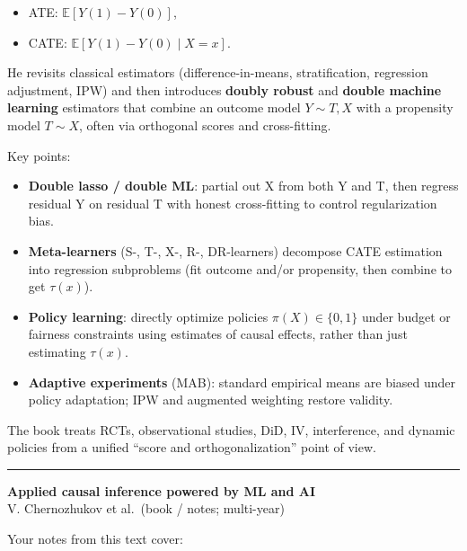 \documentclass[a5paper]{article}
\providecommand{\tightlist}{%
  \setlength{\itemsep}{0pt}\setlength{\parskip}{0pt}}
\begin{document}
\begin{itemize}
\tightlist
\item
  ATE: $\mathbb{E}[Y(1)-Y(0)]$,
\item
  CATE: $\mathbb{E}[Y(1)-Y(0)\mid X=x]$.
\end{itemize}

He revisits classical estimators (difference-in-means, stratification,
regression adjustment, IPW) and then introduces \textbf{doubly robust}
and \textbf{double machine learning} estimators that combine an outcome
model $Y\sim T,X$ with a propensity model $T\sim X$, often via
orthogonal scores and cross-fitting.

Key points:

\begin{itemize}
\tightlist
\item
  \textbf{Double lasso / double ML}: partial out X from both Y and T,
  then regress residual Y on residual T with honest cross-fitting to
  control regularization bias.
\item
  \textbf{Meta-learners} (S-, T-, X-, R-, DR-learners) decompose CATE
  estimation into regression subproblems (fit outcome and/or propensity,
  then combine to get $\tau(x)$).
\item
  \textbf{Policy learning}: directly optimize policies
  \(\pi(X)\in\{0,1\}\) under budget or fairness constraints using
  estimates of causal effects, rather than just estimating $\tau(x)$.
\item
  \textbf{Adaptive experiments} (MAB): standard empirical means are
  biased under policy adaptation; IPW and augmented weighting restore
  validity.
\end{itemize}

The book treats RCTs, observational studies, DiD, IV, interference, and
dynamic policies from a unified ``score and orthogonalization'' point of
view.

\begin{center}\rule{0.5\linewidth}{0.5pt}\end{center}

\textbf{Applied causal inference powered by ML and AI}\\
V. Chernozhukov et al.~(book / notes; multi-year)

Your notes from this text cover:
\end{document}
